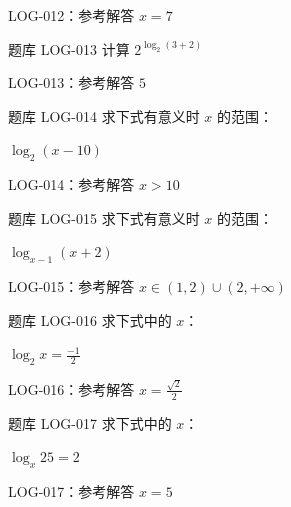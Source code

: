\documentclass[aspectratio=169,10pt]{beamer}
\begin{document}
\ifdefined\TeacherEdition
\begin{frame}[t]{LOG-012：参考解答}
$x=7$
\end{frame}
\fi

\begin{campuspractice}{题库 LOG-013}
计算 $2^{\log_2(3+2)}$
\end{campuspractice}

\ifdefined\TeacherEdition
\begin{frame}[t]{LOG-013：参考解答}
$5$
\end{frame}
\fi

\begin{campuspractice}{题库 LOG-014}
求下式有意义时 $x$ 的范围：\par
$\log_2(x-10)$
\end{campuspractice}

\ifdefined\TeacherEdition
\begin{frame}[t]{LOG-014：参考解答}
$x>10$
\end{frame}
\fi

\begin{campuspractice}{题库 LOG-015}
求下式有意义时 $x$ 的范围：\par
$\log_{x-1}(x+2)$
\end{campuspractice}

\ifdefined\TeacherEdition
\begin{frame}[t]{LOG-015：参考解答}
$x\in(1,2)\cup(2,+\infty)$
\end{frame}
\fi

\begin{campuspractice}{题库 LOG-016}
求下式中的 $x$：\par
$\log_2x=\frac{-1}{2}$
\end{campuspractice}

\ifdefined\TeacherEdition
\begin{frame}[t]{LOG-016：参考解答}
$x=\frac{\sqrt2}2$
\end{frame}
\fi

\begin{campuspractice}{题库 LOG-017}
求下式中的 $x$：\par
$\log_x25=2$
\end{campuspractice}

\ifdefined\TeacherEdition
\begin{frame}[t]{LOG-017：参考解答}
$x=5$
\end{frame}
\fi
\end{document}
